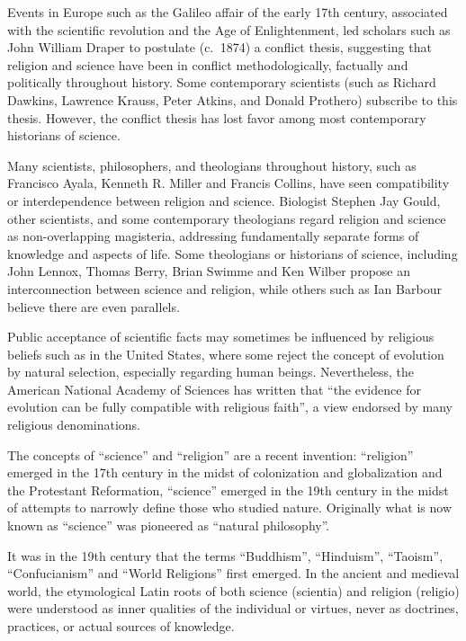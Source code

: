 \documentclass[
]{article}
\begin{document}
Events in Europe such as the Galileo affair of the early 17th century,
associated with the scientific revolution and the Age of Enlightenment,
led scholars such as John William Draper to postulate (c.  1874) a
conflict thesis, suggesting that religion and science have been in
conflict methodologically, factually and politically throughout history.
Some contemporary scientists (such as Richard Dawkins, Lawrence Krauss,
Peter Atkins, and Donald Prothero) subscribe to this thesis. However,
the conflict thesis has lost favor among most contemporary historians of
science.

Many scientists, philosophers, and theologians throughout history, such
as Francisco Ayala, Kenneth R. Miller and Francis Collins, have seen
compatibility or interdependence between religion and science. Biologist
Stephen Jay Gould, other scientists, and some contemporary theologians
regard religion and science as non-overlapping magisteria, addressing
fundamentally separate forms of knowledge and aspects of life. Some
theologians or historians of science, including John Lennox, Thomas
Berry, Brian Swimme and Ken Wilber propose an interconnection between
science and religion, while others such as Ian Barbour believe there are
even parallels.

Public acceptance of scientific facts may sometimes be influenced by
religious beliefs such as in the United States, where some reject the
concept of evolution by natural selection, especially regarding human
beings. Nevertheless, the American National Academy of Sciences has
written that ``the evidence for evolution can be fully compatible with
religious faith'', a view endorsed by many religious denominations.

The concepts of ``science'' and ``religion'' are a recent invention:
``religion'' emerged in the 17th century in the midst of colonization
and globalization and the Protestant Reformation, ``science'' emerged in
the 19th century in the midst of attempts to narrowly define those who
studied nature. Originally what is now known as ``science'' was
pioneered as ``natural philosophy''.

It was in the 19th century that the terms ``Buddhism'', ``Hinduism'',
``Taoism'', ``Confucianism'' and ``World Religions'' first emerged. In
the ancient and medieval world, the etymological Latin roots of both
science (scientia) and religion (religio) were understood as inner
qualities of the individual or virtues, never as doctrines, practices,
or actual sources of knowledge.
\end{document}
